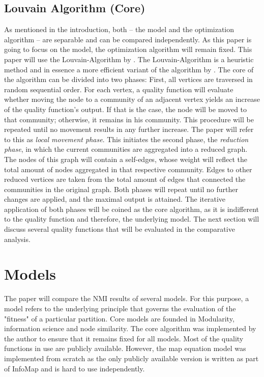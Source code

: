 \documentclass[11pt, twocolumn]{article}
\begin{document}
\subsection{Louvain Algorithm (Core)}
As mentioned in the introduction, both -- the model and the optimization algorithm -- are separable and can be compared independently. As this paper is going to focus on the model, the optimization algorithm will remain fixed. This paper will use the Louvain-Algorithm by \cite{blondel_FastUnfoldingCommunities_2008}. The Louvain-Algorithm is a heuristic method and in essence a more efficient variant of the algorithm by \citeauthor{clauset_FindingCommunityStructure_2004}. The core of the algorithm can be divided into two phases:\cite{waltman_SmartLocalMoving_2013} First, all vertices are traversed in random sequential order. For each vertex, a quality function will evaluate whether moving the node to a community of an adjacent vertex yields an increase of the quality function's output. If that is the case, the node will be moved to that community; otherwise, it remains in his community. This procedure will be repeated until no movement results in any further increase. The paper will refer to this as \emph{local movement phase}. This initiates the second phase, the \emph{reduction phase}, in which the current communities are aggregated into a reduced graph. The nodes of this graph will contain a self-edges, whose weight will reflect the total amount of nodes aggregated in that respective community. Edges to other reduced vertices are taken from the total amount of edges that connected the communities in the original graph. Both phases will repeat until no further changes are applied, and the maximal output is attained. The iterative application of both phases will be coined as the core algorithm, as it is indifferent to the quality function and therefore, the underlying model. The next section will discuss several quality functions that will be evaluated in the comparative analysis.  

\section{Models}
\label{sec:models}
The paper will compare the NMI results of several models. For this purpose, a model refers to the underlying principle that governs the evaluation of the "fitness" of a particular partition. Core models are founded in Modularity, information science and node similarity. The core algorithm was implemented by the author to ensure that it remains fixed for all models. Most of the quality functions in use are publicly available. However, the map equation model was implemented from scratch as the only publicly available version is written as part of InfoMap and is hard to use independently.
\end{document}
